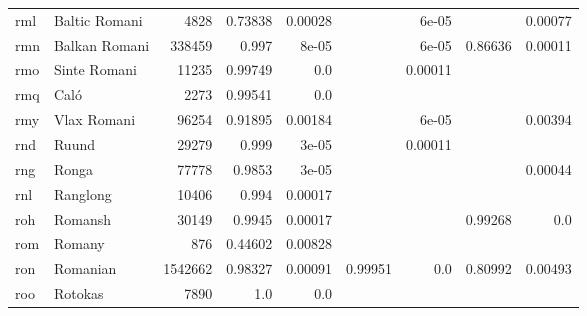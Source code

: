 \documentclass[11pt]{article}
\begin{document}
\begin{table*}[h]
{\begin{tabular}{llrrrrrrr}
rml         & Baltic Romani         & 4828         & 0.73838         & 0.00028         &          & 6e-05         &          & 0.00077         \\

rmn         & Balkan Romani         & 338459         & 0.997         & 8e-05         &          & 6e-05         & 0.86636         & 0.00011         \\

rmo         & Sinte Romani         & 11235         & 0.99749         & 0.0         &          & 0.00011         &          &          \\

rmq         & Caló         & 2273         & 0.99541         & 0.0         &          &          &          &          \\

rmy         & Vlax Romani         & 96254         & 0.91895         & 0.00184         &          & 6e-05         &          & 0.00394         \\

rnd         & Ruund         & 29279         & 0.999         & 3e-05         &          & 0.00011         &          &          \\

rng         & Ronga         & 77778         & 0.9853         & 3e-05         &          &          &          & 0.00044         \\

rnl         & Ranglong         & 10406         & 0.994         & 0.00017         &          &          &          &          \\

roh         & Romansh         & 30149         & 0.9945         & 0.00017         &          &          & 0.99268         & 0.0         \\

rom         & Romany         & 876         & 0.44602         & 0.00828         &          &          &          &          \\

ron         & Romanian         & 1542662         & 0.98327         & 0.00091         & 0.99951         & 0.0         & 0.80992         & 0.00493         \\

roo         & Rotokas         & 7890         & 1.0         & 0.0         &          &          &          &          \\


\end{tabular}}
\end{table*}
\end{document}
